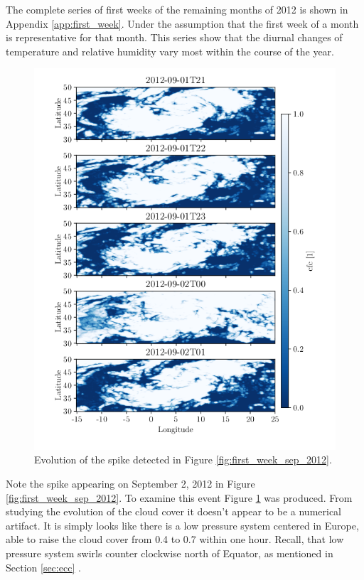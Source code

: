 The complete series of first weeks of the remaining months of 2012 is shown in Appendix \ref{app:first_week}. Under the assumption that the first week of a month is representative for that month. This series show that the diurnal changes of temperature and relative humidity vary most within the course of the year. 

\begin{figure}
    \centering
    \includegraphics{python_figs/timelapse_tcc_spike_09_2012.png}
    \caption{Evolution of the spike detected in Figure \ref{fig:first_week_sep_2012}.}
    \label{fig:spike_sep_2012}
\end{figure}
Note the spike appearing on September 2, 2012 in Figure \ref{fig:first_week_sep_2012}. To examine this event Figure \ref{fig:spike_sep_2012} was produced. From studying the evolution of the cloud cover it doesn't appear to be a numerical artifact. It is simply looks like there is a low pressure system centered in Europe, able to raise the cloud cover from 0.4 to 0.7 within one hour. Recall, that low pressure system swirls counter clockwise north of Equator, as mentioned in Section \ref{sec:ecc} . 

